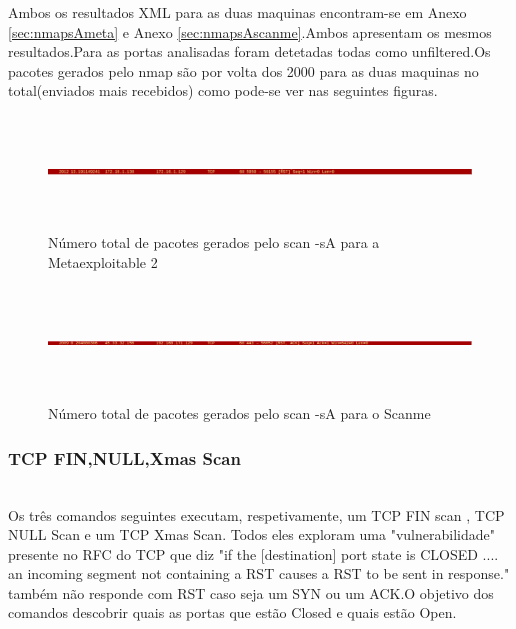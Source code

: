 Ambos os resultados XML para as duas maquinas encontram-se em Anexo \ref{sec:nmapsAmeta} e Anexo \ref{sec:nmapsAscanme}.Ambos apresentam os mesmos resultados.Para as portas 
analisadas foram detetadas todas como unfiltered.Os pacotes gerados pelo nmap são por volta dos 2000 para as duas maquinas no total(enviados mais recebidos) como pode-se ver nas seguintes figuras.

\begin{figure}[h!]
	\centering
		
	\includegraphics[width=\textwidth,height=3cm,keepaspectratio]{images/nmapsAPacotesMeta.png}
		
	\caption{Número total de pacotes gerados pelo scan -sA para a Metaexploitable 2}
		
	\label{fig:nmapsAPacotesMeta}
\end{figure}

\begin{figure}[h!]
	\centering
		
	\includegraphics[width=\textwidth,height=3cm,keepaspectratio]{images/nmapsAPacotesScanme.png}
		
	\caption{Número total de pacotes gerados pelo scan -sA para o Scanme}
		
	\label{fig:nmapsAPacotesScanme}
\end{figure}

\subsubsection{TCP FIN,NULL,Xmas Scan}
\hfill\\

Os três comandos seguintes executam, respetivamente, um TCP FIN scan , TCP NULL Scan e um TCP Xmas Scan. Todos eles exploram uma "vulnerabilidade" presente no RFC do TCP que diz "if the [destination] port state is CLOSED .... an incoming segment not containing a RST causes a RST to be sent in response." também não responde com RST caso seja um SYN ou um ACK.O objetivo dos comandos descobrir quais as portas que estão Closed e quais estão Open.

